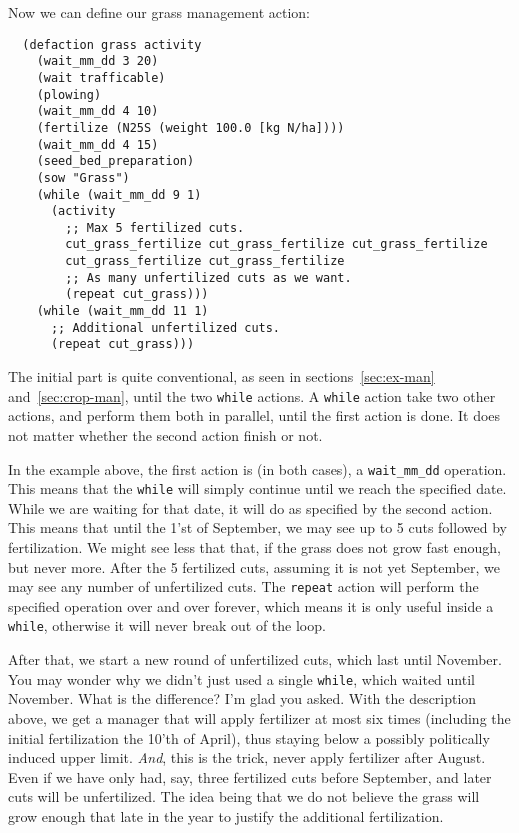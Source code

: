\documentclass[a4paper,11pt]{article}
\begin{document}
Now we can define our grass management action:
\begin{verbatim}
  (defaction grass activity
    (wait_mm_dd 3 20)
    (wait trafficable)
    (plowing)
    (wait_mm_dd 4 10)
    (fertilize (N25S (weight 100.0 [kg N/ha])))
    (wait_mm_dd 4 15)
    (seed_bed_preparation)
    (sow "Grass")
    (while (wait_mm_dd 9 1)
      (activity
        ;; Max 5 fertilized cuts.
        cut_grass_fertilize cut_grass_fertilize cut_grass_fertilize
        cut_grass_fertilize cut_grass_fertilize
        ;; As many unfertilized cuts as we want.
        (repeat cut_grass)))
    (while (wait_mm_dd 11 1)
      ;; Additional unfertilized cuts.
      (repeat cut_grass)))
\end{verbatim}
The initial part is quite conventional, as seen in
sections~\ref{sec:ex-man} and~\ref{sec:crop-man}, until the two
\texttt{while} actions.  A \texttt{while} action take two other
actions, and perform them both in parallel, until the first action is
done.  It does not matter whether the second action finish or not.

In the example above, the first action is (in both cases), a
\texttt{wait\_mm\_dd} operation.  This means that the \texttt{while}
will simply continue until we reach the specified date.  While we are
waiting for that date, it will do as specified by the second action.
This means that until the 1'st of September, we may see up to 5 cuts
followed by fertilization.  We might see less that that, if the grass
does not grow fast enough, but never more.  After the 5 fertilized
cuts, assuming it is not yet September, we may see any number of
unfertilized cuts.  The \texttt{repeat} action will perform the
specified operation over and over forever, which means it is only
useful inside a \texttt{while}, otherwise it will never break out of
the loop.

After that, we start a new round of unfertilized cuts, which last
until November.  You may wonder why we didn't just used a single
\texttt{while}, which waited until November.  What is the difference?
I'm glad you asked.  With the description above, we get a manager that
will apply fertilizer at most six times (including the initial
fertilization the 10'th of April), thus staying below a possibly
politically induced upper limit.  \emph{And}, this is the trick, never
apply fertilizer after August.  Even if we have only had, say, three
fertilized cuts before September, and later cuts will be unfertilized.
The idea being that we do not believe the grass will grow enough that
late in the year to justify the additional fertilization.
\end{document}
